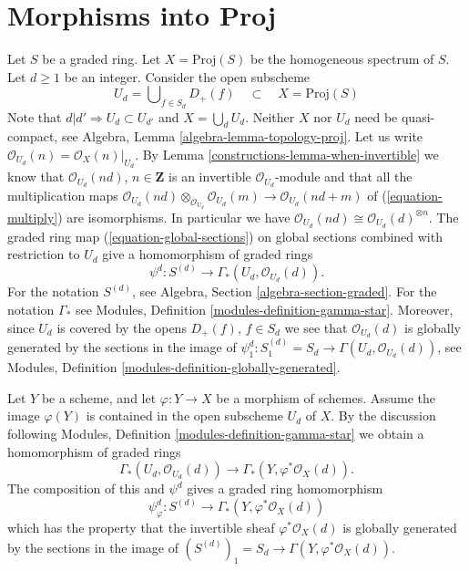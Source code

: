 \section{Morphisms into Proj}
\label{constructions-section-morphisms-proj}
Let $S$ be a graded ring.
Let $X = \text{Proj}(S)$ be the homogeneous spectrum of $S$.
Let $d \geq 1$ be an integer.
Consider the open subscheme
\begin{equation}
\label{equation-Ud}
U_d = \bigcup\nolimits_{f  \in S_d} D_{+}(f)
\quad\subset\quad
X = \text{Proj}(S)
\end{equation}
Note that $d | d' \Rightarrow U_d \subset U_{d'}$ and
$X = \bigcup_d U_d$. Neither $X$ nor $U_d$ need
be quasi-compact, see Algebra, Lemma \ref{algebra-lemma-topology-proj}.
Let us write $\mathcal{O}_{U_d}(n) = \mathcal{O}_X(n)|_{U_d}$.
By Lemma \ref{constructions-lemma-when-invertible}
we know that $\mathcal{O}_{U_d}(nd)$, $n \in \mathbf{Z}$
is an invertible $\mathcal{O}_{U_d}$-module and
that all the multiplication maps
$\mathcal{O}_{U_d}(nd) \otimes_{\mathcal{O}_{U_d}} \mathcal{O}_{U_d}(m)
\to \mathcal{O}_{U_d}(nd + m)$ of
(\ref{equation-multiply}) are isomorphisms. In particular we have
$\mathcal{O}_{U_d}(nd) \cong \mathcal{O}_{U_d}(d)^{\otimes n}$.
The graded ring map (\ref{equation-global-sections}) on global sections
combined with restriction to $U_d$ give a homomorphism of graded rings
\begin{equation}
\label{equation-psi-d}
\psi^d : S^{(d)} \longrightarrow \Gamma_*(U_d, \mathcal{O}_{U_d}(d)).
\end{equation}
For the notation $S^{(d)}$, see Algebra, Section \ref{algebra-section-graded}.
For the notation $\Gamma_*$ see
Modules, Definition \ref{modules-definition-gamma-star}.
Moreover, since $U_d$ is covered by the opens $D_{+}(f)$, $f \in S_d$
we see that $\mathcal{O}_{U_d}(d)$ is globally generated
by the sections in the image of
$\psi^d_1 : S^{(d)}_1 = S_d \to \Gamma(U_d, \mathcal{O}_{U_d}(d))$, see
Modules, Definition \ref{modules-definition-globally-generated}.

\medskip\noindent
Let $Y$ be a scheme, and let $\varphi : Y \to X$ be a morphism of schemes.
Assume the image $\varphi(Y)$ is contained in the open subscheme
$U_d$ of $X$.
By the discussion following
Modules, Definition \ref{modules-definition-gamma-star}
we obtain a homomorphism of graded rings
$$
\Gamma_*(U_d, \mathcal{O}_{U_d}(d))
\longrightarrow
\Gamma_*(Y, \varphi^*\mathcal{O}_X(d)).
$$
The composition of this and $\psi^d$ gives a graded ring
homomorphism
\begin{equation}
\label{equation-psi-phi-d}
\psi_\varphi^d :
S^{(d)}
\longrightarrow
\Gamma_*(Y, \varphi^*\mathcal{O}_X(d))
\end{equation}
which has the property that the invertible sheaf
$\varphi^*\mathcal{O}_X(d)$ is globally generated
by the sections in the image of
$(S^{(d)})_1 = S_d \to \Gamma(Y, \varphi^*\mathcal{O}_X(d))$.

